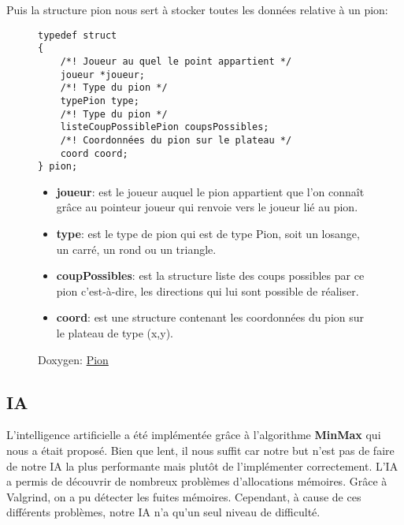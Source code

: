\documentclass{article}
\begin{document}
        Puis la structure pion nous sert à stocker toutes les données relative à un pion:
        \begin{figure}[!h]
            \centering
            \begin{minipage}{8cm}
                \begin{lstlisting}
typedef struct
{
    /*! Joueur au quel le point appartient */
    joueur *joueur;
    /*! Type du pion */
    typePion type;
    /*! Type du pion */
    listeCoupPossiblePion coupsPossibles;
    /*! Coordonnées du pion sur le plateau */
    coord coord;
} pion;
                \end{lstlisting}
            \end{minipage}
            \begin{minipage}{7.5cm}
                \begin{itemize}
                    \item \textbf{joueur}: est le joueur auquel le pion appartient que l'on connaît grâce au pointeur joueur qui renvoie vers le joueur lié au pion. 
                    \item \textbf{type}: est le type de pion qui est de type Pion, soit un losange, un carré, un rond ou un triangle.
                    \item \textbf{coupPossibles}: est la structure liste des coups possibles par ce pion c'est-à-dire, les directions qui lui sont possible de réaliser.
                    \item \textbf{coord}: est une structure contenant les coordonnées du pion sur le plateau de type (x,y).
                \end{itemize}
            \end{minipage}
            \caption*{Doxygen: \href{https://obito.fr/docs/jeuTraversse/structpion.html}{Pion}}
        \end{figure}

    \subsection{IA}
        L'intelligence artificielle a été implémentée grâce à l'algorithme \textbf{MinMax} qui nous a était proposé. Bien que lent, il nous suffit car notre but n'est pas de faire de notre IA la plus performante mais plutôt de l'implémenter correctement. L'IA a permis de découvrir de nombreux problèmes d'allocations mémoires. Grâce à Valgrind, on a pu détecter les fuites mémoires. Cependant, à cause de ces différents problèmes, notre IA n'a qu'un seul niveau de difficulté.
\end{document}

